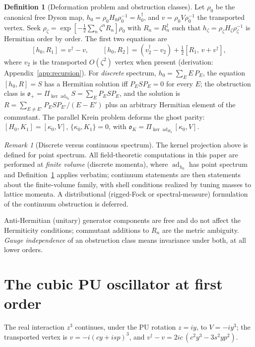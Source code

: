 \documentclass[11pt]{article}
\theoremstyle{definition}
\newtheorem{definition}[theorem]{Definition}
\theoremstyle{remark}
\newtheorem{remark}[theorem]{Remark}
\newcommand{\dg}{\dagger}
\newcommand{\ad}{\operatorname{ad}}
\newcommand{\ob}{\mathfrak o}
\newcommand{\kerad}{\Pi_{\ker\ad_{h_0}}}
\begin{document}
\begin{definition}[Deformation problem and obstruction classes]
\label{def:complex}
Let $\rho_0$ be the canonical free Dyson map,
$h_0=\rho_0H_0\rho_0^{-1}=h_0^{\dg}$, and $v=\rho_0V\rho_0^{-1}$ the
transported vertex.  Seek
$\rho_\zeta=\exp[-\tfrac12\sum_n\zeta^nR_n]\rho_0$ with
$R_n=R_n^{\dg}$ such that $h_\zeta=\rho_\zeta H_\zeta\rho_\zeta^{-1}$
is Hermitian order by order.  The first two equations are
\begin{equation}\label{eq:defeq}
[h_0,R_1]=v^{\dg}-v,
\qquad
[h_0,R_2]=(v_2^{\dg}-v_2)+\tfrac12[R_1,\,v+v^{\dg}],
\end{equation}
where $v_2$ is the transported $O(\zeta^2)$ vertex when present
(derivation: Appendix~\ref{app:recursion}).  For \emph{discrete}
spectrum, $h_0=\sum_EE\,P_E$, the equation $[h_0,R]=S$ has a Hermitian
solution iff $P_ESP_E=0$ for every $E$; the obstruction class is
$\ob_+=\kerad S=\sum_EP_ESP_E$, and the solution is
$R=\sum_{E\neq E'}P_ESP_{E'}/(E-E')$ plus an arbitrary Hermitian
element of the commutant.  The parallel Krein problem deforms the ghost
parity: $[H_0,K_1]=[\kappa_0,V]$, $\{\kappa_0,K_1\}=0$, with
$\ob_K=\Pi_{\ker\ad_{H_0}}[\kappa_0,V]$.
\end{definition}

\begin{remark}[Discrete versus continuous spectrum]\label{rem:volume}
The kernel projection above is defined for point spectrum.  All
field-theoretic computations in this paper are performed at
\emph{finite volume} (discrete momenta), where $\ad_{h_0}$ has point
spectrum and Definition~\ref{def:complex} applies verbatim; continuum
statements are then statements about the finite-volume family, with
shell conditions realized by tuning masses to lattice momenta.  A
distributional (rigged-Fock or spectral-measure) formulation of the
continuum obstruction is deferred.
\end{remark}

Anti-Hermitian (unitary) generator components are free and do not
affect the Hermiticity conditions; commutant additions to $R_n$ are the
metric ambiguity.  \emph{Gauge independence} of an obstruction class
means invariance under both, at all lower orders.

\section{The cubic PU oscillator at first order}\label{sec:first}

The real interaction $z^3$ continues, under the PU rotation $z=iy$, to
$V=-iy^3$; the transported vertex is $v=-i(cy+isp)^3$, and
$v^{\dg}-v=2ic\,(c^2y^3-3s^2yp^2)$.
\end{document}
